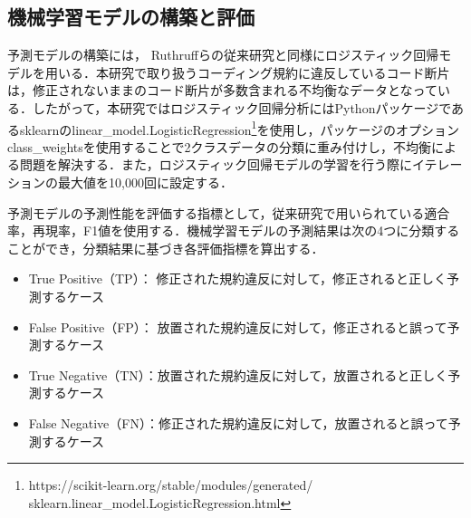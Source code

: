 \documentclass[T,J]{fose} %
\begin{document}
\subsection{機械学習モデルの構築と評価}

予測モデルの構築には，
Ruthruffらの従来研究と同様にロジスティック回帰モデルを用いる\cite{JyuraiPre}．本研究で取り扱うコーディング規約に違反しているコード断片は，修正されないままのコード断片が多数含まれる不均衡なデータとなっている．したがって，本研究ではロジスティック回帰分析にはPythonパッケージであるsklearnのlinear\_model.LogisticRegression\footnote{https://scikit-learn.org/stable/modules/generated/\\sklearn.linear\_model.LogisticRegression.html}を使用し，パッケージのオプションclass\_weightsを使用することで2クラスデータの分類に重み付けし，不均衡による問題を解決する．また，ロジスティック回帰モデルの学習を行う際にイテレーションの最大値を10,000回に設定する．

予測モデルの予測性能を評価する指標として，従来研究で用いられている適合率，再現率，F1値を使用する．機械学習モデルの予測結果は次の4つに分類することができ，分類結果に基づき各評価指標を算出する．
\begin{itemize}
\item True Positive（TP）： 修正された規約違反に対して，修正されると正しく予測するケース
\item False Positive（FP）： 放置された規約違反に対して，修正されると誤って予測するケース
\item True Negative（TN）：放置された規約違反に対して，放置されると正しく予測するケース
\item False Negative（FN）：修正された規約違反に対して，放置されると誤って予測するケース
\end{itemize}

\end{document}
